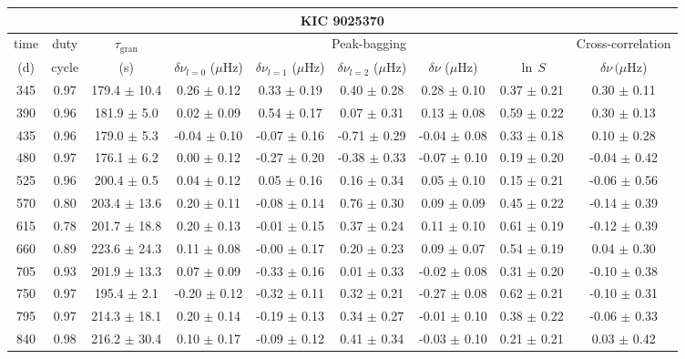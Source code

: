 \documentclass[twocolumn]{aastex61}%
\begin{document}
\begin{table*}[ht]\centering\fontsize{9.}{7.}\selectfont
\begin{tabular}{ccc|ccccc|c}
\multicolumn{9}{c}{KIC 9025370}\\ \hline\hline
time & duty & $\tau_\text{gran}$ &\multicolumn{5}{c|}{Peak-bagging}&Cross-correlation\\
(d)& cycle & (s)&$\delta\nu_{l=0}$ ($\mu$Hz) & $\delta\nu_{l=1}$ ($\mu$Hz) & $\delta\nu_{l=2}$ ($\mu$Hz) & $\delta\nu$ ($\mu$Hz)& $\ln\,S$ & $\delta\nu\,(\mu$Hz)\\\hline
345 & 0.97 & 179.4 $\pm$ 10.4 & 0.26 $\pm$ 0.12 & 0.33 $\pm$ 0.19 & 0.40 $\pm$ 0.28 & 0.28 $\pm$ 0.10 & 0.37 $\pm$ 0.21 & 0.30 $\pm$ 0.11\\
390 & 0.96 & 181.9 $\pm$ 5.0 & 0.02 $\pm$ 0.09 & 0.54 $\pm$ 0.17 & 0.07 $\pm$ 0.31 & 0.13 $\pm$ 0.08 & 0.59 $\pm$ 0.22 & 0.30 $\pm$ 0.13\\
435 & 0.96 & 179.0 $\pm$ 5.3 & -0.04 $\pm$ 0.10 & -0.07 $\pm$ 0.16 & -0.71 $\pm$ 0.29 & -0.04 $\pm$ 0.08 & 0.33 $\pm$ 0.18 & 0.10 $\pm$ 0.28\\
480 & 0.97 & 176.1 $\pm$ 6.2 & 0.00 $\pm$ 0.12 & -0.27 $\pm$ 0.20 & -0.38 $\pm$ 0.33 & -0.07 $\pm$ 0.10 & 0.19 $\pm$ 0.20 & -0.04 $\pm$ 0.42\\
525 & 0.96 & 200.4 $\pm$ 0.5 & 0.04 $\pm$ 0.12 & 0.05 $\pm$ 0.16 & 0.16 $\pm$ 0.34 & 0.05 $\pm$ 0.10 & 0.15 $\pm$ 0.21 & -0.06 $\pm$ 0.56\\
570 & 0.80 & 203.4 $\pm$ 13.6 & 0.20 $\pm$ 0.11 & -0.08 $\pm$ 0.14 & 0.76 $\pm$ 0.30 & 0.09 $\pm$ 0.09 & 0.45 $\pm$ 0.22 & -0.14 $\pm$ 0.39\\
615 & 0.78 & 201.7 $\pm$ 18.8 & 0.20 $\pm$ 0.13 & -0.01 $\pm$ 0.15 & 0.37 $\pm$ 0.24 & 0.11 $\pm$ 0.10 & 0.61 $\pm$ 0.19 & -0.12 $\pm$ 0.39\\
660 & 0.89 & 223.6 $\pm$ 24.3 & 0.11 $\pm$ 0.08 & -0.00 $\pm$ 0.17 & 0.20 $\pm$ 0.23 & 0.09 $\pm$ 0.07 & 0.54 $\pm$ 0.19 & 0.04 $\pm$ 0.30\\
705 & 0.93 & 201.9 $\pm$ 13.3 & 0.07 $\pm$ 0.09 & -0.33 $\pm$ 0.16 & 0.01 $\pm$ 0.33 & -0.02 $\pm$ 0.08 & 0.31 $\pm$ 0.20 & -0.10 $\pm$ 0.38\\
750 & 0.97 & 195.4 $\pm$ 2.1 & -0.20 $\pm$ 0.12 & -0.32 $\pm$ 0.11 & 0.32 $\pm$ 0.21 & -0.27 $\pm$ 0.08 & 0.62 $\pm$ 0.21 & -0.10 $\pm$ 0.31\\
795 & 0.97 & 214.3 $\pm$ 18.1 & 0.20 $\pm$ 0.14 & -0.19 $\pm$ 0.13 & 0.34 $\pm$ 0.27 & -0.01 $\pm$ 0.10 & 0.38 $\pm$ 0.22 & -0.06 $\pm$ 0.33\\
840 & 0.98 & 216.2 $\pm$ 30.4 & 0.10 $\pm$ 0.17 & -0.09 $\pm$ 0.12 & 0.41 $\pm$ 0.34 & -0.03 $\pm$ 0.10 & 0.21 $\pm$ 0.21 & 0.03 $\pm$ 0.42\\

\end{tabular}
\end{table*}
\end{document}
